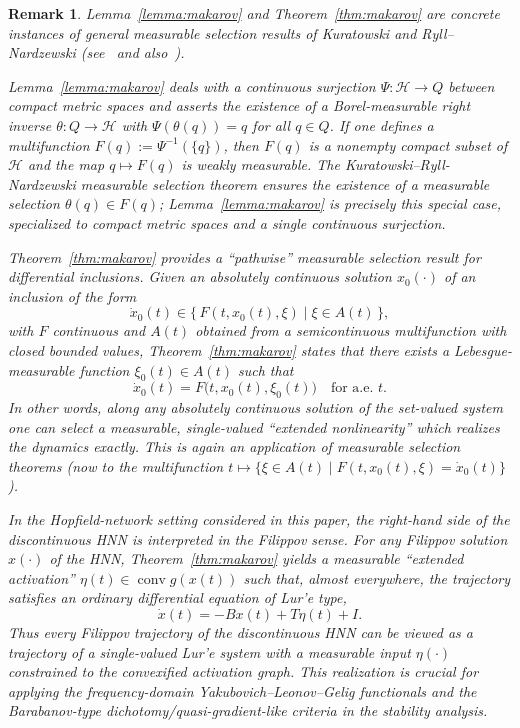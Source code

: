 \documentclass[journal]{IEEEtran}
\theoremstyle{myplain}
\newtheorem{remark}{Remark}
\begin{document}
\begin{remark}%
Lemma~\ref{lemma:makarov} and Theorem~\ref{thm:makarov} are concrete instances of general measurable
selection results of Kuratowski and Ryll--Nardzewski
(see~\cite{kuratowski-ryll-nardzewski-1965} 
and also~\cite{wagner-1977-measurable-selection-survey,castaing-valadier-1977,srivastava-1998-borel-sets}).

Lemma~\ref{lemma:makarov} deals with a continuous surjection
$\Psi:\mathcal{H}\to Q$ between compact metric spaces and asserts the
existence of a Borel-measurable right inverse
$\theta:Q\to\mathcal{H}$ with $\Psi(\theta(q))=q$ for all $q\in Q$.
If one defines a multifunction $F(q):=\Psi^{-1}(\{q\})$, then
$F(q)$ is a nonempty compact subset of $\mathcal{H}$ and the map
$q\mapsto F(q)$ is weakly measurable. The Kuratowski--Ryll-Nardzewski
measurable selection theorem ensures the existence of a measurable
selection $\theta(q)\in F(q)$; 
Lemma~\ref{lemma:makarov} is precisely this special
case, specialized to compact metric spaces and a single continuous
surjection.

Theorem~\ref{thm:makarov} provides a ``pathwise'' measurable selection result
for differential inclusions. Given an absolutely continuous solution
$x_0(\cdot)$ of an inclusion of the form
\[
   \dot x_0(t) \in \{\,F(t,x_0(t),\xi)\mid \xi\in A(t)\,\},
\]
with $F$ continuous and $A(t)$ obtained from a semicontinuous
multifunction with closed bounded values, 
Theorem~\ref{thm:makarov} states that there
exists a Lebesgue-measurable function $\xi_0(t)\in A(t)$ such that
\[
   \dot x_0(t) = F\bigl(t,x_0(t),\xi_0(t)\bigr)
   \quad\text{for a.e. }t.
\]
In other words, along any absolutely continuous solution of the
set-valued system one can select a measurable, single-valued
``extended nonlinearity'' which realizes the dynamics exactly. This is
again an application of measurable selection theorems (now to the
multifunction
$t\mapsto\{\xi\in A(t)\mid F(t,x_0(t),\xi)=\dot x_0(t)\}$).

In the Hopfield-network setting considered in this paper, the
right-hand side of the discontinuous HNN is interpreted in the Filippov
sense. For any Filippov solution $x(\cdot)$ of the HNN, Theorem~\ref{thm:makarov}
yields a measurable ``extended activation''
$\eta(t)\in\operatorname{conv} g(x(t))$ such that, almost everywhere,
the trajectory satisfies an ordinary differential equation of Lur'e
type,
\[
   \dot x(t) = -B x(t) + T \eta(t) + I.
\]
Thus every Filippov trajectory of the discontinuous HNN can be viewed
as a trajectory of a single-valued Lur'e system with a measurable
input $\eta(\cdot)$ constrained to the convexified activation graph.
This realization is crucial for applying the frequency-domain
Yakubovich--Leonov--Gelig functionals and the Barabanov-type
dichotomy/quasi-gradient-like criteria in the stability analysis.
\end{remark}
\end{document}
